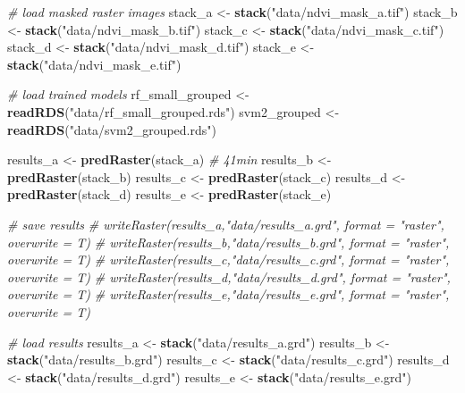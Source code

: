 \documentclass[12pt,twoside]{reedthesis}
\newenvironment{Shaded}{\begin{snugshade}}{\end{snugshade}}
\newcommand{\CommentTok}[1]{\textcolor[rgb]{0.56,0.35,0.01}{\textit{#1}}}
\newcommand{\KeywordTok}[1]{\textcolor[rgb]{0.13,0.29,0.53}{\textbf{#1}}}
\newcommand{\NormalTok}[1]{#1}
\newcommand{\StringTok}[1]{\textcolor[rgb]{0.31,0.60,0.02}{#1}}
\begin{document}
\begin{Shaded}
\begin{Highlighting}[]
\CommentTok{# load masked raster images}
\NormalTok{stack_a <-}\StringTok{ }\KeywordTok{stack}\NormalTok{(}\StringTok{"data/ndvi_mask_a.tif"}\NormalTok{)}
\NormalTok{stack_b <-}\StringTok{ }\KeywordTok{stack}\NormalTok{(}\StringTok{"data/ndvi_mask_b.tif"}\NormalTok{)}
\NormalTok{stack_c <-}\StringTok{ }\KeywordTok{stack}\NormalTok{(}\StringTok{"data/ndvi_mask_c.tif"}\NormalTok{)}
\NormalTok{stack_d <-}\StringTok{ }\KeywordTok{stack}\NormalTok{(}\StringTok{"data/ndvi_mask_d.tif"}\NormalTok{)}
\NormalTok{stack_e <-}\StringTok{ }\KeywordTok{stack}\NormalTok{(}\StringTok{"data/ndvi_mask_e.tif"}\NormalTok{)}

\CommentTok{# load trained models}
\NormalTok{rf_small_grouped <-}\StringTok{ }\KeywordTok{readRDS}\NormalTok{(}\StringTok{"data/rf_small_grouped.rds"}\NormalTok{)}
\NormalTok{svm2_grouped <-}\StringTok{ }\KeywordTok{readRDS}\NormalTok{(}\StringTok{"data/svm2_grouped.rds"}\NormalTok{)}

\NormalTok{results_a <-}\StringTok{ }\KeywordTok{predRaster}\NormalTok{(stack_a) }\CommentTok{# 41min}
\NormalTok{results_b <-}\StringTok{ }\KeywordTok{predRaster}\NormalTok{(stack_b)}
\NormalTok{results_c <-}\StringTok{ }\KeywordTok{predRaster}\NormalTok{(stack_c)}
\NormalTok{results_d <-}\StringTok{ }\KeywordTok{predRaster}\NormalTok{(stack_d)}
\NormalTok{results_e <-}\StringTok{ }\KeywordTok{predRaster}\NormalTok{(stack_e)}

\CommentTok{# save results}
\CommentTok{# writeRaster(results_a,"data/results_a.grd", format = "raster", overwrite = T)}
\CommentTok{# writeRaster(results_b,"data/results_b.grd", format = "raster", overwrite = T)}
\CommentTok{# writeRaster(results_c,"data/results_c.grd", format = "raster", overwrite = T)}
\CommentTok{# writeRaster(results_d,"data/results_d.grd", format = "raster", overwrite = T)}
\CommentTok{# writeRaster(results_e,"data/results_e.grd", format = "raster", overwrite = T)}

\CommentTok{# load results}
\NormalTok{results_a <-}\StringTok{ }\KeywordTok{stack}\NormalTok{(}\StringTok{"data/results_a.grd"}\NormalTok{)}
\NormalTok{results_b <-}\StringTok{ }\KeywordTok{stack}\NormalTok{(}\StringTok{"data/results_b.grd"}\NormalTok{)}
\NormalTok{results_c <-}\StringTok{ }\KeywordTok{stack}\NormalTok{(}\StringTok{"data/results_c.grd"}\NormalTok{)}
\NormalTok{results_d <-}\StringTok{ }\KeywordTok{stack}\NormalTok{(}\StringTok{"data/results_d.grd"}\NormalTok{)}
\NormalTok{results_e <-}\StringTok{ }\KeywordTok{stack}\NormalTok{(}\StringTok{"data/results_e.grd"}\NormalTok{)}


\end{Highlighting}
\end{Shaded}
\end{document}
